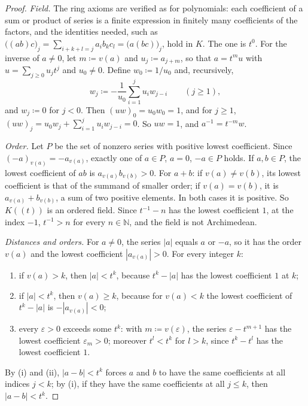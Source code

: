\begin{proof}
\emph{Field.} The ring axioms are verified as for polynomials: each coefficient of a sum or product of series is a finite expression in finitely many coefficients of the factors, and the identities needed, such as $\bigl((ab)c\bigr)_j=\sum_{i+k+l=j}a_ib_kc_l=\bigl(a(bc)\bigr)_j$, hold in $K$. The one is $t^0$. For the inverse of $a\ne0$, let $m\coloneqq v(a)$ and $u_j\coloneqq a_{j+m}$, so that $a=t^mu$ with $u=\sum_{j\ge0}u_jt^j$ and $u_0\ne0$. Define $w_0\coloneqq1/u_0$ and, recursively,
\[
w_j\coloneqq-\frac1{u_0}\sum_{i=1}^{j}u_iw_{j-i}\qquad(j\ge1),
\]
and $w_j\coloneqq0$ for $j<0$. Then $(uw)_0=u_0w_0=1$, and for $j\ge1$, $(uw)_j=u_0w_j+\sum_{i=1}^ju_iw_{j-i}=0$. So $uw=1$, and $a^{-1}=t^{-m}w$.

\emph{Order.} Let $P$ be the set of nonzero series with positive lowest coefficient. Since $(-a)_{v(a)}=-a_{v(a)}$, exactly one of $a\in P$, $a=0$, $-a\in P$ holds. If $a,b\in P$, the lowest coefficient of $ab$ is $a_{v(a)}b_{v(b)}>0$. For $a+b$: if $v(a)\ne v(b)$, its lowest coefficient is that of the summand of smaller order; if $v(a)=v(b)$, it is $a_{v(a)}+b_{v(b)}$, a sum of two positive elements. In both cases it is positive. So $K((t))$ is an ordered field. Since $t^{-1}-n$ has the lowest coefficient $1$, at the index $-1$, $t^{-1}>n$ for every $n\in\mathbb N$, and the field is not Archimedean.

\emph{Distances and orders.} For $a\ne0$, the series $|a|$ equals $a$ or $-a$, so it has the order $v(a)$ and the lowest coefficient $|a_{v(a)}|>0$. For every integer $k$:
\begin{enumerate}
\item if $v(a)>k$, then $|a|<t^k$, because $t^k-|a|$ has the lowest coefficient $1$ at $k$;
\item if $|a|<t^k$, then $v(a)\ge k$, because for $v(a)<k$ the lowest coefficient of $t^k-|a|$ is $-|a_{v(a)}|<0$;
\item every $\varepsilon>0$ exceeds some $t^k$: with $m\coloneqq v(\varepsilon)$, the series $\varepsilon-t^{m+1}$ has the lowest coefficient $\varepsilon_m>0$; moreover $t^l<t^k$ for $l>k$, since $t^k-t^l$ has the lowest coefficient $1$.
\end{enumerate}
By (i) and (ii), $|a-b|<t^k$ forces $a$ and $b$ to have the same coefficients at all indices $j<k$; by (i), if they have the same coefficients at all $j\le k$, then $|a-b|<t^k$.


\end{proof}
